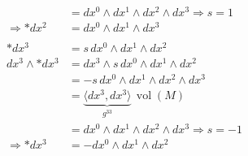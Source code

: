\begin{align*}
	\\
	&=
	dx^0 \wedge dx^1 \wedge dx^2 \wedge dx^3 \Rightarrow s = 1
	\\
	\Rightarrow \ast dx^2 
	&=
	dx^0 \wedge dx^1 \wedge dx^3
\\
\\
	\ast dx^3 
	&=
	s \, dx^0 \wedge dx^1 \wedge dx^2
	\\
	dx^3 \wedge \ast dx^3 
	&=
	dx^3 \wedge s \, dx^0 \wedge dx^1 \wedge dx^2 
	\\
	&= -s \, dx^0 \wedge dx^1 \wedge dx^2 \wedge dx^3
	\\
	&=
	\underbrace{\langle dx^3, dx^3 \rangle}_{g^{33}} \, \operatorname{vol}(M) 
	\\
	&=
	dx^0 \wedge dx^1 \wedge dx^2 \wedge dx^3 \Rightarrow s = -1
	\\
	\Rightarrow \ast dx^3 
	&=
	-dx^0 \wedge dx^1 \wedge dx^2
\end{align*}

